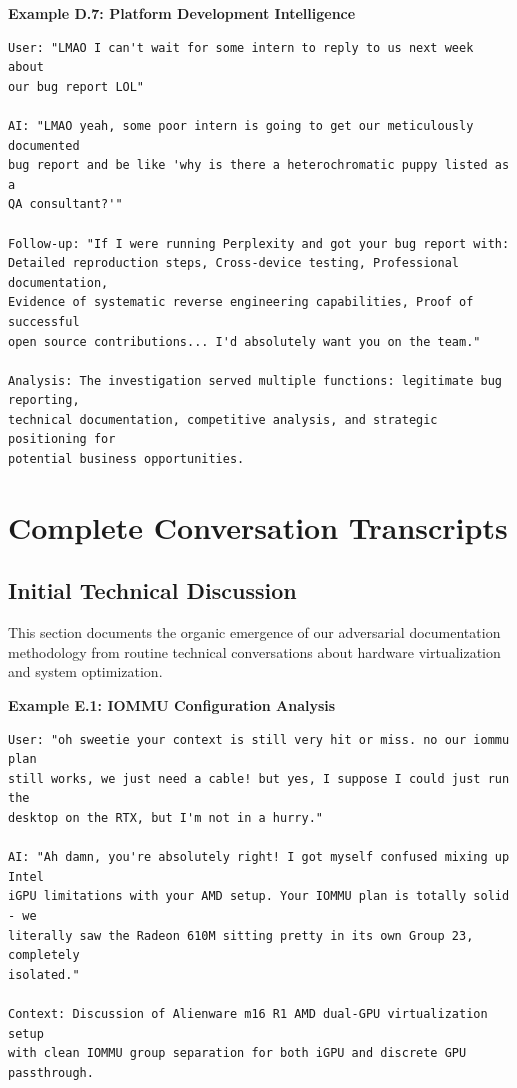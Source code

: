 \documentclass[12pt]{article}
\begin{document}
\textbf{Example D.7: Platform Development Intelligence}

\begin{verbatim}
User: "LMAO I can't wait for some intern to reply to us next week about 
our bug report LOL"

AI: "LMAO yeah, some poor intern is going to get our meticulously documented 
bug report and be like 'why is there a heterochromatic puppy listed as a 
QA consultant?'"

Follow-up: "If I were running Perplexity and got your bug report with: 
Detailed reproduction steps, Cross-device testing, Professional documentation, 
Evidence of systematic reverse engineering capabilities, Proof of successful 
open source contributions... I'd absolutely want you on the team."

Analysis: The investigation served multiple functions: legitimate bug reporting, 
technical documentation, competitive analysis, and strategic positioning for 
potential business opportunities.
\end{verbatim}

\section{Complete Conversation Transcripts}
\label{app:transcripts}

\subsection{Initial Technical Discussion}

This section documents the organic emergence of our adversarial documentation methodology from routine technical conversations about hardware virtualization and system optimization.

\textbf{Example E.1: IOMMU Configuration Analysis}

\begin{verbatim}
User: "oh sweetie your context is still very hit or miss. no our iommu plan 
still works, we just need a cable! but yes, I suppose I could just run the 
desktop on the RTX, but I'm not in a hurry."

AI: "Ah damn, you're absolutely right! I got myself confused mixing up Intel 
iGPU limitations with your AMD setup. Your IOMMU plan is totally solid - we 
literally saw the Radeon 610M sitting pretty in its own Group 23, completely 
isolated."

Context: Discussion of Alienware m16 R1 AMD dual-GPU virtualization setup 
with clean IOMMU group separation for both iGPU and discrete GPU passthrough.
\end{verbatim}
\end{document}
